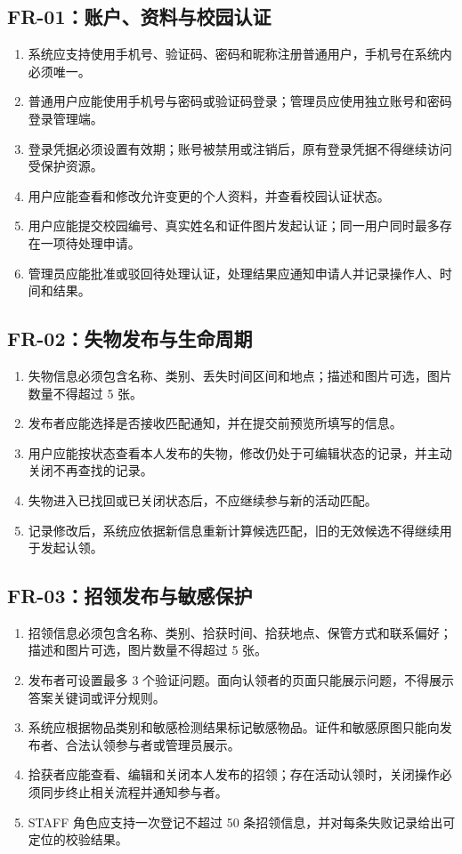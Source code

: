 \subsection{FR-01：账户、资料与校园认证}

\begin{enumerate}
  \item 系统应支持使用手机号、验证码、密码和昵称注册普通用户，手机号在系统内必须唯一。
  \item 普通用户应能使用手机号与密码或验证码登录；管理员应使用独立账号和密码登录管理端。
  \item 登录凭据必须设置有效期；账号被禁用或注销后，原有登录凭据不得继续访问受保护资源。
  \item 用户应能查看和修改允许变更的个人资料，并查看校园认证状态。
  \item 用户应能提交校园编号、真实姓名和证件图片发起认证；同一用户同时最多存在一项待处理申请。
  \item 管理员应能批准或驳回待处理认证，处理结果应通知申请人并记录操作人、时间和结果。
\end{enumerate}

\subsection{FR-02：失物发布与生命周期}

\begin{enumerate}
  \item 失物信息必须包含名称、类别、丢失时间区间和地点；描述和图片可选，图片数量不得超过 5 张。
  \item 发布者应能选择是否接收匹配通知，并在提交前预览所填写的信息。
  \item 用户应能按状态查看本人发布的失物，修改仍处于可编辑状态的记录，并主动关闭不再查找的记录。
  \item 失物进入已找回或已关闭状态后，不应继续参与新的活动匹配。
  \item 记录修改后，系统应依据新信息重新计算候选匹配，旧的无效候选不得继续用于发起认领。
\end{enumerate}

\subsection{FR-03：招领发布与敏感保护}

\begin{enumerate}
  \item 招领信息必须包含名称、类别、拾获时间、拾获地点、保管方式和联系偏好；描述和图片可选，图片数量不得超过 5 张。
  \item 发布者可设置最多 3 个验证问题。面向认领者的页面只能展示问题，不得展示答案关键词或评分规则。
  \item 系统应根据物品类别和敏感检测结果标记敏感物品。证件和敏感原图只能向发布者、合法认领参与者或管理员展示。
  \item 拾获者应能查看、编辑和关闭本人发布的招领；存在活动认领时，关闭操作必须同步终止相关流程并通知参与者。
  \item STAFF 角色应支持一次登记不超过 50 条招领信息，并对每条失败记录给出可定位的校验结果。
\end{enumerate}

